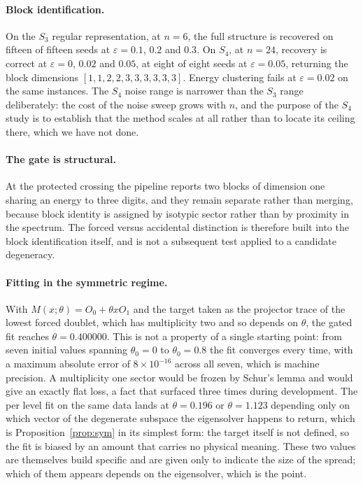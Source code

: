 \documentclass[11pt]{article}
\begin{document}
\paragraph{Block identification.}
On the $S_3$ regular representation, at $n=6$, the full structure is recovered on
fifteen of fifteen seeds at $\varepsilon=0.1$, $0.2$ and $0.3$. On $S_4$, at
$n=24$, recovery is correct at $\varepsilon=0$, $0.02$ and $0.05$, at eight of
eight seeds at $\varepsilon=0.05$, returning the block dimensions
$[1,1,2,2,3,3,3,3,3,3]$. Energy clustering fails at $\varepsilon=0.02$ on the
same instances. The $S_4$ noise range is narrower than the $S_3$ range
deliberately: the cost of the noise sweep grows with $n$, and the purpose of the
$S_4$ study is to establish that the method scales at all rather than to locate
its ceiling there, which we have not done.

\paragraph{The gate is structural.}
At the protected crossing the pipeline reports two blocks of dimension one
sharing an energy to three digits, and they remain separate rather than merging,
because block identity is assigned by isotypic sector rather than by proximity in
the spectrum. The forced versus accidental distinction is therefore built into
the block identification itself, and is not a subsequent test applied to a
candidate degeneracy.

\paragraph{Fitting in the symmetric regime.}
With $M(x;\theta)=O_0+\theta xO_1$ and the target taken as the projector trace of
the lowest forced doublet, which has multiplicity two and so depends on $\theta$,
the gated fit reaches $\theta=0.400000$. This is not a property of a single
starting point: from seven initial values spanning $\theta_0=0$ to $\theta_0=0.8$
the fit converges every time, with a maximum absolute error of $8\times10^{-16}$
across all seven, which is machine precision. A multiplicity one sector would be
frozen by Schur's lemma and would give an exactly flat loss, a fact that surfaced
three times during development. The per level fit on the same data lands at
$\theta=0.196$ or $\theta=1.123$ depending only on which vector of the degenerate
subspace the eigensolver happens to return, which is Proposition~\ref{prop:sym}
in its simplest form: the target itself is not defined, so the fit is biased by
an amount that carries no physical meaning. These two values are themselves build specific and are given only to indicate
the size of the spread; which of them appears depends on the eigensolver, which
is the point.
\end{document}

